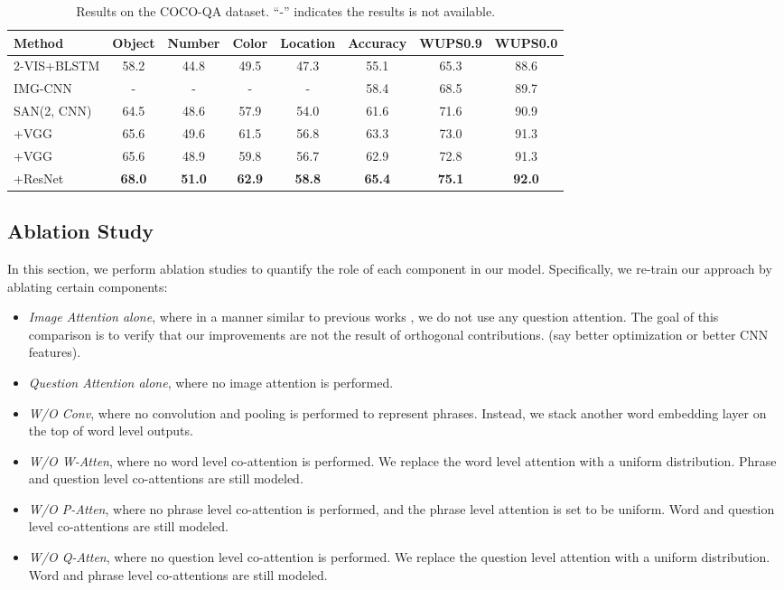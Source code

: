 \documentclass{article}
\begin{document}
\begin{table}[t]\footnotesize
\setlength{\tabcolsep}{5.5pt}
  \caption{Results on the COCO-QA dataset. ``-'' indicates the results is not available.} \label{tab:cocoqa}
  \centering
  \begin{tabular}{l c c c c c c c}
    \toprule
    Method  & Object & Number & Color & Location & Accuracy & WUPS0.9 & WUPS0.0 \\
    \midrule	    
	2-VIS+BLSTM \cite{ren2015exploring} & 58.2 & 44.8 & 49.5 & 47.3 & 55.1 & 65.3 & 88.6\\
	IMG-CNN \cite{ma2015learning} & - & - & - & - & 58.4 &  68.5 &  89.7\\	
	SAN(2, CNN) \cite{yang2015stacked} & 64.5 & 48.6 & 57.9 & 54.0 & 61.6 & 71.6 &  90.9 \\
    \midrule	    	 
	 +VGG & 65.6 & 49.6 & 61.5 & 56.8 & 63.3 & 73.0 & 91.3\\	
	 +VGG & 65.6 & 48.9 & 59.8 & 56.7  & 62.9 & 72.8 & 91.3\\
	 +ResNet & \textbf{68.0} & \textbf{51.0} & \textbf{62.9} & \textbf{58.8} & \textbf{65.4}& \textbf{75.1} & \textbf{92.0} \\
   \bottomrule
  \end{tabular}
\end{table}
\subsection{Ablation Study}
\label{subsec:ablation}
In this section, we perform ablation studies to quantify the role of each component in our model. Specifically, we re-train our approach by ablating certain components:
\begin{itemize}
\item \emph{Image Attention alone}, where in a manner similar to previous works \cite{yang2015stacked}, we do not use any question attention. The goal of this comparison is to verify that our improvements are not the result of orthogonal contributions. (say better optimization or better CNN features). 
\item \emph{Question Attention alone}, where no image attention is performed.
\item \emph{W/O Conv}, where no convolution and pooling is performed to represent phrases. Instead, we stack another word embedding layer on the top of word level outputs. 
\item \emph{W/O W-Atten}, where no word level co-attention is performed. We replace the word level attention with a uniform distribution. Phrase and question level co-attentions are still modeled.
\item \emph{W/O P-Atten}, where no phrase level co-attention is performed, and the phrase level attention is set to be uniform. Word and question level co-attentions are still modeled.
\item \emph{W/O Q-Atten}, where no question level co-attention is performed. We replace the question level attention with a uniform distribution. Word and phrase level co-attentions are still modeled.
\end{itemize}
\end{document}
